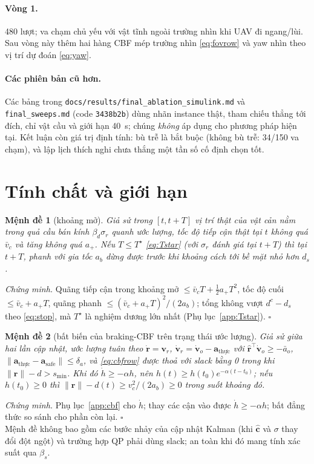 \documentclass[11pt,a4paper]{article}
\numberwithin{equation}{section}
\newcommand{\vb}[1]{\bm{#1}}
\newcommand{\T}{^{\!\top}}
\newcommand{\code}[1]{\texttt{\small #1}}
\theoremstyle{definition}
\theoremstyle{plain}
\newtheorem{proposition}{Mệnh đề}
\theoremstyle{remark}
\begin{document}
\paragraph{Vòng 1.} 480 lượt; va chạm chủ yếu với vật tĩnh ngoài trường nhìn khi UAV đi ngang/lùi. Sau vòng này thêm hai hàng CBF mép trường nhìn \eqref{eq:fovrow} và yaw nhìn theo vị trí dự đoán \eqref{eq:yaw}.

\paragraph{Các phiên bản cũ hơn.} Các bảng trong \code{docs/results/final\_ablation\_simulink.md} và \code{final\_sweeps.md} (code \code{3438b2b}) dùng nhãn instance thật, tham chiếu thẳng tới đích, chỉ vật cầu và giới hạn 40~s; chúng \emph{không} áp dụng cho phương pháp hiện tại. Kết luận còn giá trị định tính: bù trễ là bắt buộc (không bù trễ: 34/150 va chạm), và lập lịch thích nghi chưa thắng một tần số cố định chọn tốt.

\section{Tính chất và giới hạn}
\label{sec:props}

\begin{proposition}[khoảng mở]\label{prop:scan}
Giả sử trong $[t,t+T]$ vị trí thật của vật cản nằm trong quả cầu bán kính $\beta_d\sigma_r$ quanh ước lượng, tốc độ tiếp cận thật tại $t$ không quá $\bar v_c$ và tăng không quá $a_+$. Nếu $T\le T^\star$ \eqref{eq:Tstar} (với $\sigma_r$ đánh giá tại $t+T$) thì tại $t+T$, phanh với gia tốc $a_b$ dừng được trước khi khoảng cách tới bề mặt nhỏ hơn $d_s$.
\end{proposition}
\emph{Chứng minh.} Quãng tiếp cận trong khoảng mở $\le\bar v_cT+\tfrac12a_+T^2$, tốc độ cuối $\le\bar v_c+a_+T$, quãng phanh $\le(\bar v_c+a_+T)^2/(2a_b)$; tổng không vượt $d^c-d_s$ theo \eqref{eq:stop}, mà $T^\star$ là nghiệm dương lớn nhất (Phụ lục~\ref{app:Tstar}). $\square$

\begin{proposition}[bất biến của braking-CBF trên trạng thái ước lượng]\label{prop:cbf}
Giả sử giữa hai lần cập nhật, ước lượng tuân theo $\dot{\vb r}=\vb v_r$, $\dot{\vb v}_r=\dot{\vb v}_o-\vb a_{\text{thực}}$ với $\hat{\vb r}\T\dot{\vb v}_o\ge-\bar a_o$, $\|\vb a_{\text{thực}}-\vb a_{\text{safe}}\|\le\delta_a$, và \eqref{eq:cbfrow} được thoả với slack bằng 0 trong khi $\|\vb r\|-d>s_{\min}$. Khi đó $\dot h\ge-\alpha h$, nên $h(t)\ge h(t_0)e^{-\alpha(t-t_0)}$; nếu $h(t_0)\ge0$ thì $\|\vb r\|-d(t)\ge v_c^2/(2a_b)\ge0$ trong suốt khoảng đó.
\end{proposition}
\emph{Chứng minh.} Phụ lục~\ref{app:cbf} cho $\dot h$; thay các cận vào được $\dot h\ge-\alpha h$; bất đẳng thức so sánh cho phần còn lại. $\square$\\
Mệnh đề không bao gồm các bước nhảy của cập nhật Kalman (khi $\hat{\vb c}$ và $\sigma$ thay đổi đột ngột) và trường hợp QP phải dùng slack; an toàn khi đó mang tính xác suất qua $\beta_s$.
\end{document}
